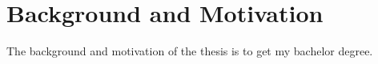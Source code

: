 \section{Background and Motivation}
The background and motivation of the thesis is to get my bachelor degree.